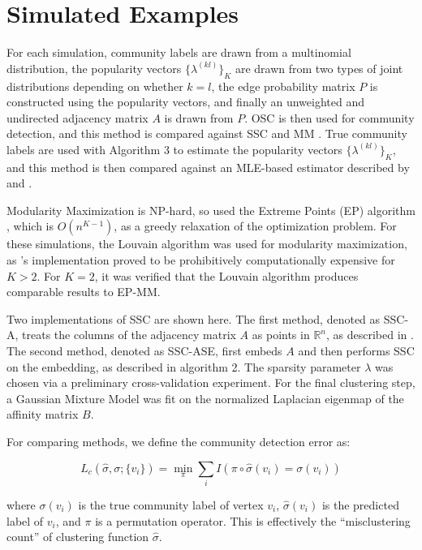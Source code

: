 \documentclass[12pt]{article}
\begin{document}
\hypertarget{simulated-examples}{%
\section{Simulated Examples}\label{simulated-examples}}

For each simulation, community labels are drawn from a multinomial
distribution, the popularity vectors \(\{\lambda^{(kl)}\}_K\) are drawn
from two types of joint distributions depending on whether \(k = l\),
the edge probability matrix \(P\) is constructed using the popularity
vectors, and finally an unweighted and undirected adjacency matrix \(A\)
is drawn from \(P\). OSC is then used for community detection, and this
method is compared against SSC \cite{noroozi2019estimation,soltanolkotabi2014}
and MM \cite{igraph, 307cbeb9b1be48299388437423d94bf1}. 
True community labels are used
with Algorithm 3 to estimate the popularity vectors
\(\{\lambda^{(kl)}\}_K\), and this method is then compared against an
MLE-based estimator described by \citeauthor{noroozi2019estimation} and
\citeauthor{307cbeb9b1be48299388437423d94bf1}.

Modularity Maximization is NP-hard, so
\citeauthor{307cbeb9b1be48299388437423d94bf1} used the Extreme Points
(EP) algorithm \cite{le2016}, which is \(O(n^{K - 1})\), as a greedy
relaxation of the optimization problem. For these simulations, the
Louvain algorithm was used for modularity maximization,
as \citeauthor{307cbeb9b1be48299388437423d94bf1}'s implementation proved to be
prohibitively computationally expensive for \(K > 2\). For \(K = 2\), it
was verified that the Louvain algorithm produces comparable results
to EP-MM.

Two implementations of SSC are shown here. The first method, denoted as
SSC-A, treats the columns of the adjacency matrix \(A\) as points in
\(\mathbb{R}^n\), as described in \citeauthor{noroozi2019estimation}.
The second method, denoted as SSC-ASE, first embeds \(A\) and then
performs SSC on the embedding, as described in algorithm 2. The sparsity
parameter \(\lambda\) was chosen via a preliminary cross-validation
experiment. For the final clustering step, a Gaussian Mixture Model was
fit on the normalized Laplacian eigenmap of the affinity matrix \(B\).

For comparing methods, we define the community detection error as:

\[L_c(\hat{\sigma}, \sigma; \{v_i\}) =
\min_\pi \sum_i I(\pi \circ \hat{\sigma}(v_i) = \sigma(v_i))\]

where \(\sigma(v_i)\) is the true community label of vertex \(v_i\),
\(\hat{\sigma}(v_i)\) is the predicted label of \(v_i\), and \(\pi\) is
a permutation operator. This is effectively the ``misclustering count''
of clustering function \(\hat{\sigma}\).
\end{document}
